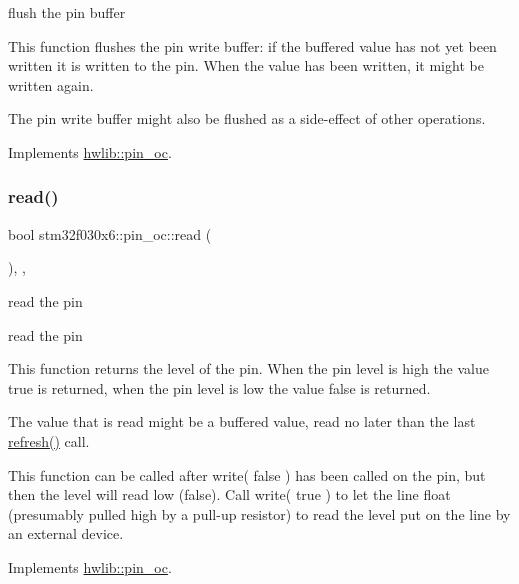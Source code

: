 flush the pin buffer

This function flushes the pin write buffer\+: if the buffered value has not yet been written it is written to the pin. When the value has been written, it might be written again.

The pin write buffer might also be flushed as a side-\/effect of other operations. 

Implements \hyperlink{classhwlib_1_1pin__oc_a021036a4566c712e43250ddd28a85e54}{hwlib\+::pin\+\_\+oc}.

\mbox{\label{classstm32f030x6_1_1pin__oc_a97615ebdacdd8405e87f8f6440e5fce1}} 
\subsubsection{\texorpdfstring{read()}{read()}}
{\footnotesize\ttfamily bool stm32f030x6\+::pin\+\_\+oc\+::read (\begin{DoxyParamCaption}{ }\end{DoxyParamCaption})\hspace{0.3cm}{\ttfamily [inline]}, {\ttfamily [override]}, {\ttfamily [virtual]}}





read the pin

read the pin

This function returns the level of the pin. When the pin level is high the value true is returned, when the pin level is low the value false is returned.

The value that is read might be a buffered value, read no later than the last \hyperlink{classstm32f030x6_1_1pin__oc_ab856468835abcd32a9161b94c789ec7d}{refresh()} call.

This function can be called after write( false ) has been called on the pin, but then the level will read low (false). Call write( true ) to let the line float (presumably pulled high by a pull-\/up resistor) to read the level put on the line by an external device. 

Implements \hyperlink{classhwlib_1_1pin__oc_a51180afd605add59b96105fa98e29f88}{hwlib\+::pin\+\_\+oc}.

\mbox{\label{classstm32f030x6_1_1pin__oc_ab856468835abcd32a9161b94c789ec7d}} 
